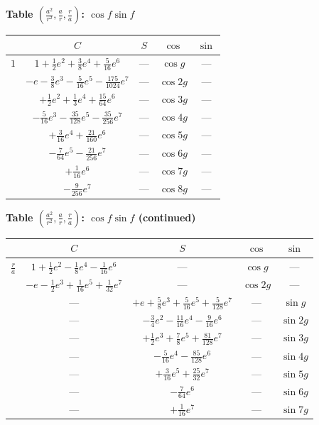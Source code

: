 \documentclass[11pt,a4paper]{book}
\begin{document}
\vspace{1em}

\noindent\textbf{Table $(\frac{a^2}{r^2}, \frac{a}{r}, \frac{r}{a})$: $\cos f \sin f$}

\vspace{0.5em}

\begin{center}
\begin{tabular}{|c|c|c|c|c|}
\hline
& $C$ & $S$ & $\cos$ & $\sin$ \\
\hline
$1$ & $1 + \frac{1}{2}e^2 + \frac{3}{8}e^4 + \frac{5}{16}e^6$ & --- & $\cos g$ & --- \\
& $-e - \frac{3}{8}e^3 - \frac{5}{16}e^5 - \frac{175}{1024}e^7$ & --- & $\cos 2g$ & --- \\
& $+ \frac{1}{2}e^2 + \frac{1}{3}e^4 + \frac{15}{64}e^6$ & --- & $\cos 3g$ & --- \\
& $- \frac{5}{16}e^3 - \frac{35}{128}e^5 - \frac{35}{256}e^7$ & --- & $\cos 4g$ & --- \\
& $+ \frac{3}{16}e^4 + \frac{21}{160}e^6$ & --- & $\cos 5g$ & --- \\
& $- \frac{7}{64}e^5 - \frac{21}{256}e^7$ & --- & $\cos 6g$ & --- \\
& $+ \frac{1}{16}e^6$ & --- & $\cos 7g$ & --- \\
& $- \frac{9}{256}e^7$ & --- & $\cos 8g$ & --- \\
\hline
\end{tabular}
\end{center}

\vspace{1em}

\noindent\textbf{Table $(\frac{a^2}{r^2}, \frac{a}{r}, \frac{r}{a})$: $\cos f \sin f$ (continued)}

\vspace{0.5em}

\begin{center}
\begin{tabular}{|c|c|c|c|c|}
\hline
& $C$ & $S$ & $\cos$ & $\sin$ \\
\hline
$\frac{r}{a}$ & $1 + \frac{1}{2}e^2 - \frac{1}{8}e^4 - \frac{1}{16}e^6$ & --- & $\cos g$ & --- \\
& $-e - \frac{1}{2}e^3 + \frac{1}{16}e^5 + \frac{1}{32}e^7$ & --- & $\cos 2g$ & --- \\
& --- & $+e + \frac{5}{8}e^3 + \frac{5}{16}e^5 + \frac{5}{128}e^7$ & --- & $\sin g$ \\
& --- & $- \frac{3}{4}e^2 - \frac{11}{16}e^4 - \frac{9}{16}e^6$ & --- & $\sin 2g$ \\
& --- & $+ \frac{1}{2}e^3 + \frac{7}{8}e^5 + \frac{81}{128}e^7$ & --- & $\sin 3g$ \\
& --- & $- \frac{5}{16}e^4 - \frac{85}{128}e^6$ & --- & $\sin 4g$ \\
& --- & $+ \frac{3}{16}e^5 + \frac{25}{32}e^7$ & --- & $\sin 5g$ \\
& --- & $- \frac{7}{64}e^6$ & --- & $\sin 6g$ \\
& --- & $+ \frac{1}{16}e^7$ & --- & $\sin 7g$ \\
\hline
\end{tabular}
\end{center}
\end{document}
